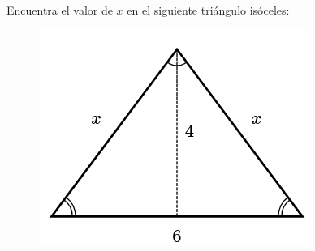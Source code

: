Encuentra el valor de $x$ en el siguiente triángulo isóceles:

\begin{figure}[H]
    \centering
    \includegraphics[width=0.3\linewidth]{../images/pitagoras2.png}
    \caption{}
    \label{fig:pitagoras2}
\end{figure}
